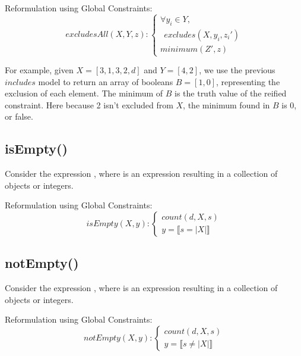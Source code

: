 Reformulation using Global Constraints:
\begin{equation}\label{csp:excludesAll}
    excludesAll(X,Y,z):
    \begin{cases}
        \forall y_i \in Y,\\
        ~~excludes(X,y_i,z_i')\\
        minimum(Z',z)
    \end{cases}
\end{equation}

For example, given $X=[3,1,3,2,d]$ and $Y=[4,2]$, we use the previous $includes$ model to return an array of booleans $B=[1,0]$, representing the exclusion of each element.
The minimum of $B$ is the truth value of the reified constraint.
Here because 2 isn't excluded from $X$, the minimum found in $B$ is 0, or false.

\newpage\subsection{isEmpty()}
Consider the expression , where  is an expression resulting in a collection of objects or integers.

Reformulation using Global Constraints:
\begin{equation}\label{csp:isEmpty}
    isEmpty(X,y):
    \begin{cases}
        count(d,X,s)\\
        y = \llbracket s = |X| \rrbracket
    \end{cases}
\end{equation}

\subsection{notEmpty()}
Consider the expression , where  is an expression resulting in a collection of objects or integers.

Reformulation using Global Constraints:
\begin{equation}\label{csp:notEmpty}
    notEmpty(X,y):
    \begin{cases}
        count(d,X,s)\\
        y = \llbracket s \neq |X| \rrbracket
    \end{cases}
\end{equation}

